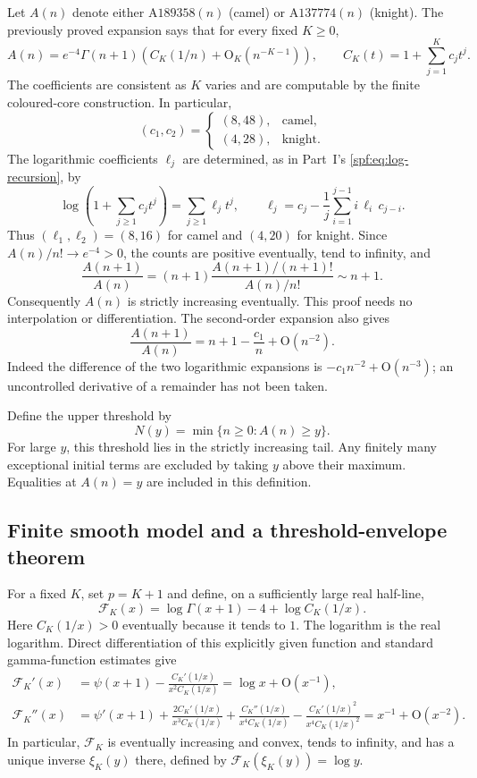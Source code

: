 \documentclass[11pt]{article}
\numberwithin{equation}{section}
\theoremstyle{definition}
\theoremstyle{remark}
\theoremstyle{definition}
\newcommand{\bigO}{\mathrm O}
\begin{document}
Let $A(n)$ denote either $\mathrm{A189358}(n)$ (camel) or
$\mathrm{A137774}(n)$ (knight). The previously proved expansion says that for
every fixed $K\geq0$,
\begin{equation}
 A(n)=e^{-4}\Gamma(n+1)
 \left(C_K(1/n)+\bigO_K(n^{-K-1})\right),\qquad
 C_K(t)=1+\sum_{j=1}^Kc_jt^j.
 \label{spf:cg:inv:input}
\end{equation}
The coefficients are consistent as $K$ varies and are computable by the
finite coloured-core construction. In particular,
\[
 (c_1,c_2)=
 \begin{cases}(8,48),&\text{camel},\\(4,28),&\text{knight}.
 \end{cases}
\]
The logarithmic coefficients $\ell_j$ are determined, as in Part~I's
\eqref{spf:eq:log-recursion}, by
\[
 \log\left(1+\sum_{j\geq1}c_jt^j\right)=\sum_{j\geq1}\ell_jt^j,
 \qquad
 \ell_j=c_j-\frac1j\sum_{i=1}^{j-1}i\,\ell_i\,c_{j-i}.
\]
Thus $(\ell_1,\ell_2)=(8,16)$ for camel and $(4,20)$ for knight.
Since $A(n)/n!\to e^{-4}>0$, the counts are positive eventually, tend to
infinity, and
\[
 \frac{A(n+1)}{A(n)}=(n+1)
 \frac{A(n+1)/(n+1)!}{A(n)/n!}\sim n+1.
\]
Consequently $A(n)$ is strictly increasing eventually. This proof needs no
interpolation or differentiation. The second-order expansion also gives
\[
 \frac{A(n+1)}{A(n)}=n+1-\frac{c_1}{n}+\bigO(n^{-2}).
\]
Indeed the difference of the two logarithmic expansions is
$-c_1n^{-2}+\bigO(n^{-3})$; an uncontrolled derivative of a remainder has not
been taken.

Define the upper threshold by
\[
 N(y)=\min\{n\geq0:A(n)\geq y\}.
\]
For large $y$, this threshold lies in the strictly increasing tail. Any
finitely many exceptional initial terms are excluded by taking $y$ above
their maximum. Equalities at $A(n)=y$ are included in this definition.

\subsection{Finite smooth model and a threshold-envelope theorem}

For a fixed $K$, set $p=K+1$ and define, on a sufficiently large real
half-line,
\begin{equation}
 \mathcal F_K(x)=\log\Gamma(x+1)-4+\log C_K(1/x).
 \label{spf:cg:inv:finite-model}
\end{equation}
Here $C_K(1/x)>0$ eventually because it tends to $1$. The logarithm is the
real logarithm. Direct differentiation of this explicitly given function
and standard gamma-function estimates give
\begin{align*}
 \mathcal F_K'(x)&=\psi(x+1)-\frac{C_K'(1/x)}{x^2C_K(1/x)}
             =\log x+\bigO(x^{-1}),\\
 \mathcal F_K''(x)&=\psi'(x+1)+\frac{2C_K'(1/x)}{x^3C_K(1/x)}
 +\frac{C_K''(1/x)}{x^4C_K(1/x)}
 -\frac{C_K'(1/x)^2}{x^4C_K(1/x)^2}
             =x^{-1}+\bigO(x^{-2}).
\end{align*}
In particular, $\mathcal F_K$ is eventually increasing and convex, tends to
infinity, and has a unique inverse $\xi_K(y)$ there, defined by
$\mathcal F_K(\xi_K(y))=\log y$.
\end{document}
